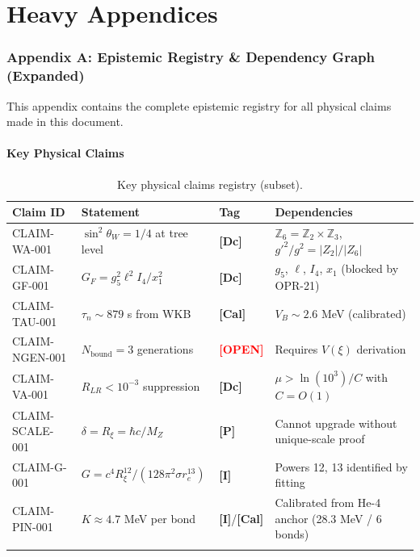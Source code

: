 \documentclass[11pt,a4paper]{article}
\newcommand{\tagP}{\textcolor{red!70!black}{\textbf{[P]}}}
\newcommand{\tagI}{\textcolor{orange!80!black}{\textbf{[I]}}}
\newcommand{\tagDc}{\textcolor{blue!70!black}{\textbf{[Dc]}}}
\newcommand{\tagCal}{\textcolor{purple!70!black}{\textbf{[Cal]}}}
\newcommand{\tagOPEN}{\textcolor{red}{\textbf{[OPEN]}}}
\begin{document}
\appendix

\part*{Heavy Appendices}

\section{Appendix A: Epistemic Registry \& Dependency Graph (Expanded)}
\label{app:epistemic}

This appendix contains the complete epistemic registry for all physical claims made in this document.

\subsection{Key Physical Claims}

\begin{longtable}{p{2.5cm}p{4cm}p{2cm}p{4cm}}
\toprule
\textbf{Claim ID} & \textbf{Statement} & \textbf{Tag} & \textbf{Dependencies} \\
\midrule
\endhead
CLAIM-WA-001 & $\sin^2\theta_W = 1/4$ at tree level & \tagDc{} & $\mathbb{Z}_6 = \mathbb{Z}_2 \times \mathbb{Z}_3$, $g'^2/g^2 = |Z_2|/|Z_6|$ \\
CLAIM-GF-001 & $G_F = g_5^2 \ell^2 I_4 / x_1^2$ & \tagDc{} & $g_5$, $\ell$, $I_4$, $x_1$ (blocked by OPR-21) \\
CLAIM-TAU-001 & $\tau_n \sim 879$ s from WKB & \tagCal{} & $V_B \sim 2.6$ MeV (calibrated) \\
CLAIM-NGEN-001 & $N_{\text{bound}} = 3$ generations & \tagOPEN{} & Requires $V(\xi)$ derivation \\
CLAIM-VA-001 & $R_{LR} < 10^{-3}$ suppression & \tagDc{} & $\mu > \ln(10^3)/C$ with $C = O(1)$ \\
CLAIM-SCALE-001 & $\delta = R_\xi = \hbar c/M_Z$ & \tagP{} & Cannot upgrade without unique-scale proof \\
CLAIM-G-001 & $G = c^4 R_\xi^{12}/(128\pi^2 \sigma r_e^{13})$ & \tagI{} & Powers 12, 13 identified by fitting \\
CLAIM-PIN-001 & $K \approx 4.7$ MeV per bond & \tagI{}/\tagCal{} & Calibrated from He-4 anchor (28.3 MeV / 6 bonds) \\
\bottomrule
\caption{Key physical claims registry (subset).}
\end{longtable}
\end{document}
